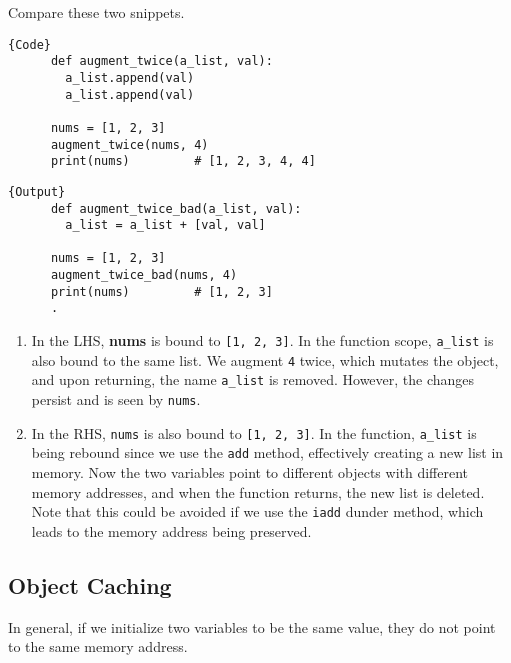 \documentclass{article}
\begin{document}
    Compare these two snippets. 

    \noindent\begin{minipage}{.5\textwidth}
    \begin{lstlisting}[]{Code}
      def augment_twice(a_list, val):
        a_list.append(val)
        a_list.append(val)

      nums = [1, 2, 3]
      augment_twice(nums, 4)
      print(nums)         # [1, 2, 3, 4, 4]
    \end{lstlisting}
    \end{minipage}
    \hfill
    \begin{minipage}{.49\textwidth}
    \begin{lstlisting}[]{Output}
      def augment_twice_bad(a_list, val):
        a_list = a_list + [val, val]

      nums = [1, 2, 3]
      augment_twice_bad(nums, 4)
      print(nums)         # [1, 2, 3]
      .
    \end{lstlisting}
    \end{minipage}
 
    \begin{enumerate}
      \item In the LHS, \textbf{nums} is bound to \texttt{[1, 2, 3]}. In the function scope, \texttt{a\_list} is also bound to the same list. We augment \texttt{4} twice, which mutates the object, and upon returning, the name \texttt{a\_list} is removed. However, the changes persist and is seen by \texttt{nums}. 
      \item In the RHS, \texttt{nums} is also bound to \texttt{[1, 2, 3]}. In the function, \texttt{a\_list} is being rebound since we use the \texttt{add} method, effectively creating a new list in memory. Now the two variables point to different objects with different memory addresses, and when the function returns, the new list is deleted. Note that this could be avoided if we use the \texttt{iadd} dunder method, which leads to the memory address being preserved. 
    \end{enumerate}

  \subsection{Object Caching}

    In general, if we initialize two variables to be the same value, they do not point to the same memory address. 
\end{document}
